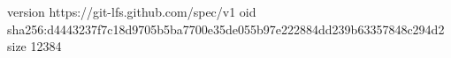version https://git-lfs.github.com/spec/v1
oid sha256:d4443237f7c18d9705b5ba7700e35de055b97e222884dd239b63357848c294d2
size 12384
